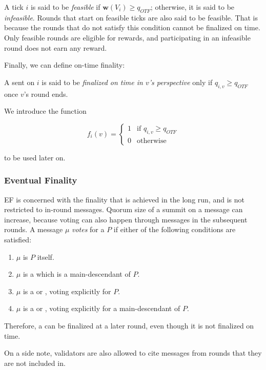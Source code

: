 A tick $i$ is said to be \emph{feasible} if $\boldsymbol{w}(V_i)\geq q_{OTF}$; otherwise, it is said to be \emph{infeasible}. Rounds that start on feasible ticks are also said to be feasible. That is because the rounds that do not satisfy this condition cannot be finalized on time. Only feasible rounds are eligible for rewards, and participating in an infeasible round does not earn any reward.

Finally, we can define on-time finality:

\begin{definition}
  A \PROP sent on $i$ is said to be \emph{finalized on time in $v$'s perspective} only if $q_{i,v} \geq q_{OTF}$ once $v$'s round ends.
\end{definition}

We introduce the function

\begin{equation}
  f_i(v) =
  \begin{cases}
    1 & \text{if } q_{i,v} \geq q_{OTF} \\
    0 & \text{otherwise}
  \end{cases}
\end{equation}

to be used later on.

\subsubsection*{Eventual Finality}
\label{sec:eventual-finality}

EF is concerned with the finality that is achieved in the long run, and is not restricted to in-round messages. Quorum size of a summit on a message can increase, because voting can also happen through messages in the subsequent rounds. A message $\mu$ \emph{votes} for a \PROP $P$ if either of the following conditions are satisfied:

\begin{enumerate}
\def\labelenumi{\arabic{enumi}.}
\item $\mu$ is $P$ itself.
\item $\mu$ is a \PROP which is a main-descendant of $P$.
\item $\mu$ is a \CONF or \WIT, voting explicitly for $P$.
\item $\mu$ is a \CONF or \WIT, voting explicitly for a main-descendant of $P$.
\end{enumerate}

Therefore, a \PROP can be finalized at a later round, even though it is not finalized on time.

On a side note, validators are also allowed to cite messages from rounds that they are not included in.


